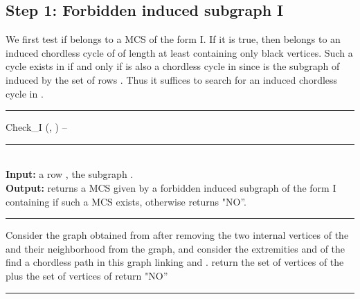 \documentclass{article}
\begin{document}
\subsection{Step 1: Forbidden induced subgraph I}

We first test if  belongs to a MCS  of the form I.
If it is true, then  belongs to an induced chordless cycle of 
of length at least  containing only black vertices. 
Such a cycle exists in  if and only if is also a chordless
cycle in  since  is the subgraph of  induced 
by the set of rows .
Thus it suffices to search for an induced chordless cycle 
in .

\begin{algorithm}[htpb]   
\rule{11.7cm}{0.01cm}
\caption{Check\_I (, ) -- }
\rule{11.7cm}{0.01cm}
\\               
{\bf Input:} a row , the subgraph .\\
{\bf Output:} returns a MCS  given by a forbidden induced subgraph of 
the form I containing  if such a MCS exists, otherwise returns  "NO''.
\rule{11.7cm}{0.01cm}               
\begin{algorithmic}[1] 
\STATE Consider the graph  obtained from  after removing the two 
internal vertices of the  and their neighborhood from the graph, and 
consider the extremities  and  of the 
\STATE find a chordless path  in this graph linking  and .
\STATE return the set of vertices of the  plus the set of vertices of 
\ENDIF
\ENDFOR
\STATE return "NO''
\end{algorithmic}
\rule{11.7cm}{0.01cm}
\end{algorithm}
\end{document}
